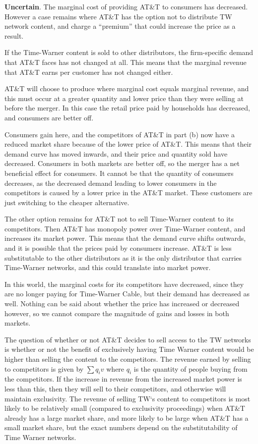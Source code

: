 \documentclass[12pt]{paper}
\begin{document}
\textbf{Uncertain}. The marginal cost of providing AT\&T to consumers
has decreased. However a case remains where AT\&T has the option not
to distribute TW network content, and charge a ``premium'' that could
increase the price as a result.


If the Time-Warner content is sold to other distributors, the
firm-specific demand that AT\&T faces has not changed at all. This
means that the marginal revenue that AT\&T earns per customer has not
changed either.


AT\&T will choose to produce where marginal cost equals marginal
revenue, and this must occur at a greater quantity and lower price
than they were selling at before the merger. In this case the retail
price paid by households has decreased, and consumers are better off.

Consumers gain here, and the competitors of AT\&T in part (b) now have
a reduced market share because of the lower price of AT\&T. This means
that their demand curve has moved inwards, and their price and
quantity sold have decreased. Consumers in both markets are better
off, so the merger has a net beneficial effect for consumers. It
cannot be that the quantity of consumers decreases, as the decreased
demand leading to lower consumers in the competitors is caused by a
lower price in the AT\&T market. These customers are just switching to
the cheaper alternative.


The other option remains for AT\&T not to sell Time-Warner content to
its competitors. Then AT\&T has monopoly power over Time-Warner
content, and increases its market power. This means that the demand
curve shifts outwards, and it is possible that the prices paid by
consumers increase. AT\&T is less substitutable to the other
distributors as it is the only distributor that carries Time-Warner
networks, and this could translate into market power.

In this world, the marginal costs for its competitors have decreased,
since they are no longer paying for Time-Warner Cable, but their
demand has decreased as well. Nothing can be said about whether the
price has increased or decreased however, so we cannot compare the
magnitude of gains and losses in both markets.


The question of whether or not AT\&T decides to sell access to the TW
networks is whether or not the benefit of exclusively having Time
Warner content would be higher than selling the content to the
competitors. The revenue earned by selling to competitors is given by
$\sum q_i v$ where $q_i$ is the quantity of people buying from the
competitors. If the increase in revenue from the increased market
power is less than this, then they will sell to their competitors, and
otherwise will maintain exclusivity. The revenue of selling TW`s
content to competitors is most likely to be relatively small (compared
to exclusivity proceedings) when AT\&T already has a large market
share, and more likely to be large when AT\&T has a small market
share, but the exact numbers depend on the substitutability of Time
Warner networks.
\end{document}
